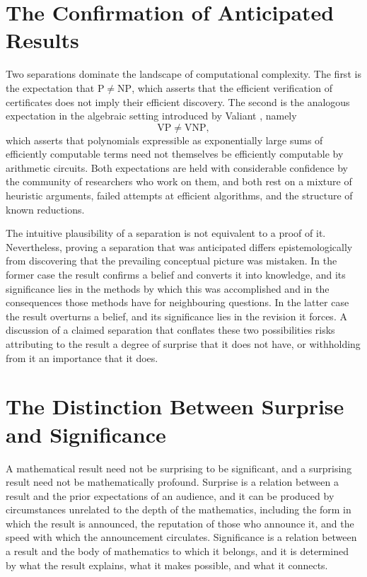 \documentclass[11pt,letterpaper]{report}
\theoremstyle{plain}
\theoremstyle{definition}
\theoremstyle{remark}
\newcommand{\VP}{\mathrm{VP}}
\newcommand{\VNP}{\mathrm{VNP}}
\newcommand{\PTIME}{\mathrm{P}}
\newcommand{\NP}{\mathrm{NP}}
\begin{document}
\section{The Confirmation of Anticipated Results}

Two separations dominate the landscape of computational complexity. The first is the expectation that $\PTIME\neq\NP$, which asserts that the efficient verification of certificates does not imply their efficient discovery. The second is the analogous expectation in the algebraic setting introduced by Valiant \cite{Valiant1979}, namely
\[
\VP\neq\VNP,
\]
which asserts that polynomials expressible as exponentially large sums of efficiently computable terms need not themselves be efficiently computable by arithmetic circuits. Both expectations are held with considerable confidence by the community of researchers who work on them, and both rest on a mixture of heuristic arguments, failed attempts at efficient algorithms, and the structure of known reductions.

The intuitive plausibility of a separation is not equivalent to a proof of it. Nevertheless, proving a separation that was anticipated differs epistemologically from discovering that the prevailing conceptual picture was mistaken. In the former case the result confirms a belief and converts it into knowledge, and its significance lies in the methods by which this was accomplished and in the consequences those methods have for neighbouring questions. In the latter case the result overturns a belief, and its significance lies in the revision it forces. A discussion of a claimed separation that conflates these two possibilities risks attributing to the result a degree of surprise that it does not have, or withholding from it an importance that it does.

\section{The Distinction Between Surprise and Significance}

A mathematical result need not be surprising to be significant, and a surprising result need not be mathematically profound. Surprise is a relation between a result and the prior expectations of an audience, and it can be produced by circumstances unrelated to the depth of the mathematics, including the form in which the result is announced, the reputation of those who announce it, and the speed with which the announcement circulates. Significance is a relation between a result and the body of mathematics to which it belongs, and it is determined by what the result explains, what it makes possible, and what it connects.
\end{document}
